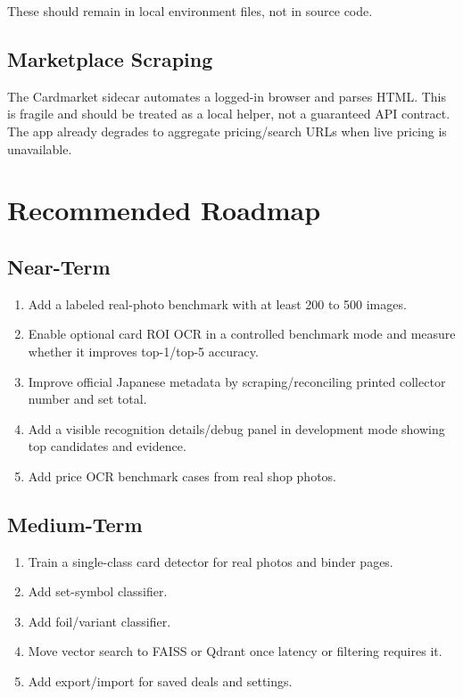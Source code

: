 \documentclass[11pt,a4paper]{article}
\begin{document}
These should remain in local environment files, not in source code.

\subsection{Marketplace Scraping}

The Cardmarket sidecar automates a logged-in browser and parses HTML. This is fragile and should be treated as a local helper, not a guaranteed API contract. The app already degrades to aggregate pricing/search URLs when live pricing is unavailable.

\section{Recommended Roadmap}

\subsection{Near-Term}

\begin{enumerate}
  \item Add a labeled real-photo benchmark with at least 200 to 500 images.
  \item Enable optional card ROI OCR in a controlled benchmark mode and measure whether it improves top-1/top-5 accuracy.
  \item Improve official Japanese metadata by scraping/reconciling printed collector number and set total.
  \item Add a visible recognition details/debug panel in development mode showing top candidates and evidence.
  \item Add price OCR benchmark cases from real shop photos.
\end{enumerate}

\subsection{Medium-Term}

\begin{enumerate}
  \item Train a single-class card detector for real photos and binder pages.
  \item Add set-symbol classifier.
  \item Add foil/variant classifier.
  \item Move vector search to FAISS or Qdrant once latency or filtering requires it.
  \item Add export/import for saved deals and settings.
\end{enumerate}
\end{document}
